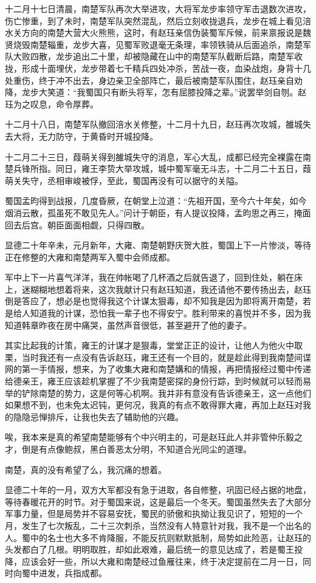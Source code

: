 十二月十七日清晨，南楚军队再次大举进攻，大将军龙步率领守军击退数次进攻，伤亡惨重，到了未时，南楚军队突然混乱，然后立刻收拢退兵，龙步在城上看见涪水关方向的南楚大营大火熊熊，这时，有赵珏亲信伪装蜀军斥候，前来禀报说是魏贤烧毁南楚辎重，龙步大喜，见蜀军败退毫无条理，率领铁骑从后面追杀，南楚军队大败四散，龙步追出二十里，却被隐藏在山中的南楚军队截断后路，南楚军收拢，形成十面埋伏，龙步带着七千精兵四处冲杀，苦战一夜，血染战炮，身背十几处重伤，终于冲不出去，身边亲卫全部阵亡，最后被南楚军队围住，赵珏亲自劝降，龙步大笑道：“我蜀国只有断头将军，怎有屈膝投降之辈。”说罢举剑自刎。赵珏为之叹息，命令厚葬。

十二月十八日，南楚军队撤回涪水关修整，十二月十九日，赵珏再次攻城，雒城失去大将，无力防守，于黄昏时开城投降。

十二月二十三日，葭萌关得到雒城失守的消息，军心大乱，成都已经完全裸露在南楚兵锋所指。同日，雍王李贽大举攻城，城中蜀军毫无斗志，十二月二十五日，葭萌关失守，丞相审峻被俘，至此，蜀国再没有可以据守的关隘。

蜀国孟昀得到战报，几度昏厥，在朝堂上泣道：“先祖开国，至今六十年矣，如今烟消云散，孤虽死不敢见先人。”问计于朝臣，有人提议投降，孟昀思之再三，掩面回去后宫。朝臣面面相觑，只得四散。

显德二十年辛未，元月新年，大雍、南楚朝野庆贺大胜，蜀国上下一片惨淡，等待正在修整的大雍和南楚两军入蜀中会师成都。

军中上下一片喜气洋洋，我在帅帐喝了几杯酒之后就告退了，回到住处，躺在床上，迷糊糊地想着将来，这次我献计只有赵珏知道，我还请他不要传扬出去，赵珏倒是答应了，想必是也觉得我这个计谋太狠毒，却不知我是因为即将离开南楚，若是给人知道我的计谋，恐怕我一辈子也不得安宁。胜利带来的喜悦并不多，因为我知道韩章昨夜在房中痛哭，虽然声音很低，甚至避开了他的妻子。

其实比起我的计策，雍王的计谋才是狠毒，堂堂正正的设计，让他人为他火中取栗，当时我还有一点没有告诉赵珏，雍王还有一个目的，就是趁此得到我南楚间谍网的第一手情报，想来，为了收集大雍和南楚媾和的情报，再把情报经过蜀中传递给德亲王，雍王应该趁机掌握了不少我南楚密探的身份行踪，到时候就可以轻而易举的铲除南楚的势力，这是何等心机啊。我并非有意没有告诉德亲王，这一点他们如果想不到，也未免太迟钝，更何况，我真的有点不敢得罪大雍，再加上赵珏对我的隐隐忌惮排斥，让我也失去了辅助他的兴趣。

唉，我本来是真的希望南楚能够有个中兴明主的，可是赵珏此人并非管仲乐毅之才，倒是有点像鲍叔，黑白善恶太分明，不知道合光同尘的道理。

南楚，真的没有希望了么，我沉痛的想着。

显德二十年的一月，双方大军都没有急于进取，各自修整，巩固已经占据的地盘，等待春暖花开的时节。对于蜀国来说，这是最后一个冬天。蜀国虽然失去了大部分军事力量，但是局势并不容易安抚，蜀民的骄傲和执拗让我见识了，短短的一个月，发生了七次叛乱，二十三次刺杀，当然没有人特意针对我，我不是一个出名的人。蜀中的名士也大多不肯降服，不能反抗则默默抵制，局势如此险恶，让赵珏的头发都白了几根。明明取胜，却如此艰难，最后统一的意见达成了，若是蜀王投降，应该会好一些，所以大雍和南楚经过鱼雁往来，终于决定提前在二月一日，同时向蜀中进发，兵指成都。


